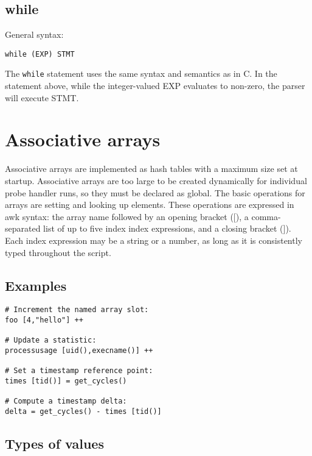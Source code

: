 \documentclass[twoside,english]{article}
\newenvironment{vindent}
{\begin{list}{}{\setlength{\listparindent}{6pt}}
\item[]}
{\end{list}}
\begin{document}
\subsection{while}
General syntax:

\begin{vindent}
\begin{verbatim}
while (EXP) STMT
\end{verbatim}
\end{vindent}
The \texttt{while} statement uses the same syntax and semantics as in C.
In the statement above, while the integer-valued EXP evaluates to non-zero,
the parser will execute STMT.


\section{Associative arrays\label{sec:Associative-Arrays}}
Associative arrays are implemented as hash tables with a maximum size set
at startup. Associative arrays are too large to be created dynamically for
individual probe handler runs, so they must be declared as global. The basic
operations for arrays are setting and looking up elements. These operations
are expressed in awk syntax: the array name followed by an opening bracket
({[}), a comma-separated list of up to five index index expressions, and
a closing bracket (]). Each index expression may be a string or a number,
as long as it is consistently typed throughout the script.


\subsection{Examples}

\begin{vindent}
\begin{verbatim}
# Increment the named array slot:
foo [4,"hello"] ++

# Update a statistic:
processusage [uid(),execname()] ++

# Set a timestamp reference point:
times [tid()] = get_cycles()

# Compute a timestamp delta:
delta = get_cycles() - times [tid()]
\end{verbatim}
\end{vindent}

\subsection{Types of values}
\end{document}
